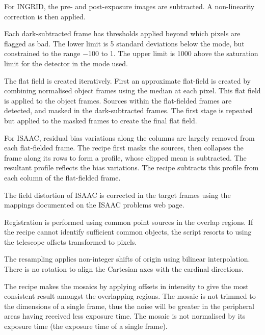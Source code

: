 \documentclass[twoside,11pt]{article}
\newcommand{\htmladdnormallink}[2]{#1}
\renewcommand{\_}{\texttt{\symbol{95}}}
\newcommand{\sstitem}{\item}
\begin{document}
{{{         \sstitem
         For INGRID, the pre- and post-exposure images are subtracted.
         A non-linearity correction is then applied.

         \sstitem
         Each dark-subtracted frame has thresholds applied beyond which
         pixels are flagged as bad.  The lower limit is 5 standard
         deviations below the mode, but constrained to the range $-$100 to 1.
         The upper limit is 1000 above the saturation limit for the detector
         in the mode used.

         \sstitem
         The flat field is created iteratively.  First an approximate
         flat-field is created by combining normalised object frames using
         the median at each pixel.  This flat field is applied to the object
         frames.  Sources within the flat-fielded frames are detected, and
         masked in the dark-subtracted frames.  The first stage is repeated
         but applied to the masked frames to create the final flat field.

         \sstitem
         For ISAAC, residual bias variations along the columns are
         largely removed from each flat-fielded frame.  The recipe first
         masks the sources, then collapses the frame along its rows to form
         a profile, whose clipped mean is subtracted.  The resultant profile
         reflects the bias variations.  The recipe subtracts this profile
         from each column of the flat-fielded frame.

         \sstitem
         The field distortion of ISAAC is corrected in the target frames
         using the mappings documented on the 
         \htmladdnormallink{ISAAC problems web page}
         {http://www.eso.org/instruments/isaac/problems_tips.html}.

         \sstitem
         Registration is performed using common point sources in the
         overlap regions.  If the recipe cannot identify sufficient common
         objects, the script resorts to using the telescope offsets
         transformed to pixels.

         \sstitem
         The resampling applies non-integer shifts of origin using
         bilinear interpolation.  There is no rotation to align the
         Cartesian axes with the cardinal directions.

         \sstitem
         The recipe makes the mosaics by applying offsets in intensity
         to give the most consistent result amongst the overlapping regions.
         The mosaic is not trimmed to the dimensions of a single frame, thus
         the noise will be greater in the peripheral areas having received
         less exposure time.  The mosaic is not normalised by its exposure
         time (the exposure time of a single frame).

}}}
\end{document}
